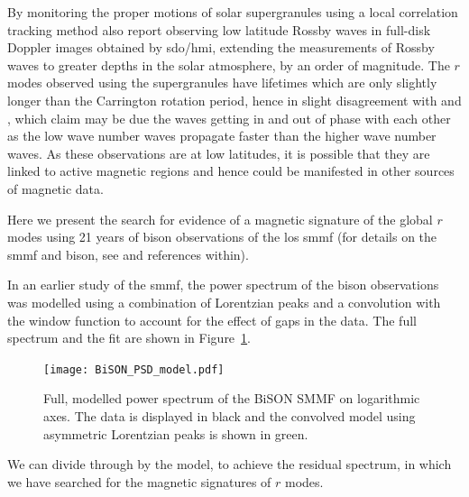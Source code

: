 By monitoring the proper motions of solar supergranules using a local correlation tracking method \citet{hathaway_hydrodynamic_2020} also report observing low latitude Rossby waves in full-disk Doppler images obtained by \gls{sdo/hmi}, extending the measurements of Rossby waves to greater depths in the solar atmosphere, by an order of magnitude. The $r$ modes observed using the supergranules have lifetimes which are only slightly longer than the Carrington rotation period, hence in slight disagreement with \citet{loptien_global-scale_2018} and \citet{liang_time-distance_2019}, which \citet{hathaway_hydrodynamic_2020} claim may be due the waves getting in and out of phase with each other as the low wave number waves propagate faster than the higher wave number waves. As these observations are at low latitudes, it is possible that they are linked to active magnetic regions and hence could be manifested in other sources of magnetic data.

Here we present the search for evidence of a magnetic signature of the global $r$ modes using 21 years of \gls{bison} observations of the \gls{los} \gls{smmf} (for details on the \gls{smmf} and \gls{bison}, see \citet{chaplin_studies_2003} and references within).

In an earlier study of the \gls{smmf}, the power spectrum of the \gls{bison} observations was modelled using a combination of Lorentzian peaks and a convolution with the window function to account for the effect of gaps in the data. The full spectrum and the fit are shown in Figure~\ref{fig:BiSON_PSD}.



\begin{figure}[ht!]
	\centering
	\texttt{[image: BiSON\_PSD\_model.pdf]}
	\caption{Full, modelled power spectrum of the BiSON SMMF on logarithmic axes. The data is displayed in black and the convolved model using asymmetric Lorentzian peaks is shown in green.}
	\label{fig:BiSON_PSD}
\end{figure}

We can divide through by the model, to achieve the residual spectrum, in which we have searched for the magnetic signatures of $r$ modes. %

